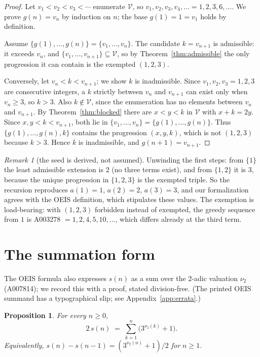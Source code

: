\documentclass[12pt]{article}
\theoremstyle{plain}
\newtheorem{proposition}[theorem]{Proposition}
\theoremstyle{definition}
\theoremstyle{remark}
\newtheorem{remark}[theorem]{Remark}
\newcommand{\V}{\mathcal{V}}
\begin{document}
\begin{proof}
Let $v_1<v_2<v_3<\cdots$ enumerate $\V$, so
$v_1,v_2,v_3,v_4,\ldots=1,2,3,6,\ldots$.  We prove
$g(n)=v_n$ by induction on $n$; the base $g(1)=1=v_1$ holds by
definition.

Assume $\{g(1),\ldots,g(n)\}=\{v_1,\ldots,v_n\}$.  The candidate
$k=v_{n+1}$ is admissible: it exceeds $v_n$, and
$\{v_1,\ldots,v_{n+1}\}\subseteq\V$, so by
Theorem~\ref{thm:admissible} the only progression it can contain
is the exempted $(1,2,3)$.

Conversely, let $v_n<k<v_{n+1}$; we show $k$ is inadmissible.
Since $v_1,v_2,v_3=1,2,3$ are consecutive integers, a $k$
strictly between $v_n$ and $v_{n+1}$ can exist only when
$v_n\geq 3$, so $k>3$.  Also $k\notin\V$, since the enumeration
has no elements between $v_n$ and $v_{n+1}$.  By
Theorem~\ref{thm:blocked} there are $x<y<k$ in $\V$ with
$x+k=2y$.  Since $x,y<k<v_{n+1}$, both lie in
$\{v_1,\ldots,v_n\}=\{g(1),\ldots,g(n)\}$.  Thus
$\{g(1),\ldots,g(n),k\}$ contains the progression $(x,y,k)$,
which is not $(1,2,3)$ because $k>3$.  Hence $k$ is
inadmissible, and $g(n+1)=v_{n+1}$.
\end{proof}

\begin{remark}[the seed is derived, not assumed]\label{rem:seed}
Unwinding the first steps: from $\{1\}$ the least admissible
extension is $2$ (no three terms exist), and from $\{1,2\}$ it is
$3$, because the unique progression in $\{1,2,3\}$ is the
exempted triple.  So the recursion reproduces
$a(1)=1$, $a(2)=2$, $a(3)=3$, and our formalization agrees with
the OEIS definition, which stipulates these values.  The
exemption is load-bearing: with $(1,2,3)$ forbidden instead of
exempted, the greedy sequence from $1$ is A003278
$=1,2,4,5,10,\ldots$, which differs already at the third term.
\end{remark}

\section{The summation form}\label{sec:sum}

The OEIS formula also expresses $s(n)$ as a sum over the $2$-adic
valuation $\nu_2$ (A007814); we record this with a proof, stated
division-free.  (The printed OEIS summand has a typographical
slip; see Appendix~\ref{app:errata}.)

\begin{proposition}\label{prop:sum}
For every $n\geq 0$,
\[
2\,s(n) \;=\; \sum_{k=1}^{n}\bigl(3^{\nu_2(k)}+1\bigr).
\]
Equivalently, $s(n)-s(n-1)=(3^{\nu_2(n)}+1)/2$ for $n\geq 1$.
\end{proposition}
\end{document}
